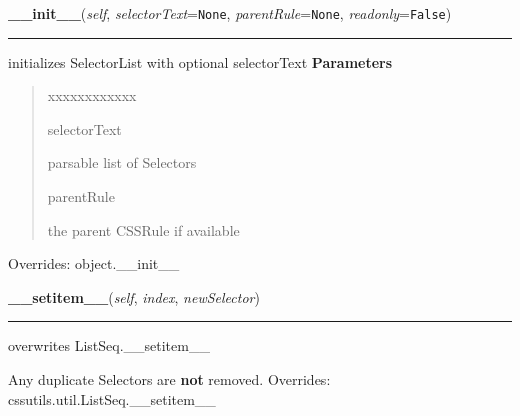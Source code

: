 \hspace{.8\funcindent}\begin{boxedminipage}{\funcwidth}

    \raggedright \textbf{\_\_init\_\_}(\textit{self}, \textit{selectorText}={\tt None}, \textit{parentRule}={\tt None}, \textit{readonly}={\tt False})

    \vspace{-1.5ex}

    \rule{\textwidth}{0.5\fboxrule}
\setlength{\parskip}{2ex}

initializes SelectorList with optional selectorText
\setlength{\parskip}{1ex}
      \textbf{Parameters}
      \vspace{-1ex}

      \begin{quote}
        \begin{Ventry}{xxxxxxxxxxxx}

          \item[selectorText]


parsable list of Selectors
          \item[parentRule]


the parent CSSRule if available
        \end{Ventry}

      \end{quote}

      Overrides: object.\_\_init\_\_

    \end{boxedminipage}

    \vspace{0.5ex}

\hspace{.8\funcindent}\begin{boxedminipage}{\funcwidth}

    \raggedright \textbf{\_\_setitem\_\_}(\textit{self}, \textit{index}, \textit{newSelector})

    \vspace{-1.5ex}

    \rule{\textwidth}{0.5\fboxrule}
\setlength{\parskip}{2ex}

overwrites ListSeq.{\_}{\_}setitem{\_}{\_}

Any duplicate Selectors are \textbf{not} removed.
\setlength{\parskip}{1ex}
      Overrides: cssutils.util.ListSeq.\_\_setitem\_\_

    \end{boxedminipage}

    \vspace{0.5ex}

